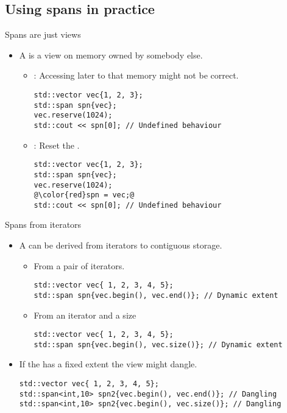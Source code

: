 \subsection{Using spans in practice}

\begin{frame}[t,fragile]{Spans are just views}
\begin{itemize}
  \item A  is a view on memory owned by somebody else.
    \begin{itemize}
      \item {}: Accessing later to that memory might not be correct.
\begin{lstlisting}
std::vector vec{1, 2, 3};
std::span spn{vec};
vec.reserve(1024);
std::cout << spn[0]; // Undefined behaviour
\end{lstlisting}

      \item {}: Reset the .
\begin{lstlisting}[escapechar=@]
std::vector vec{1, 2, 3};
std::span spn{vec};
vec.reserve(1024);
@\color{red}spn = vec;@
std::cout << spn[0]; // Undefined behaviour
\end{lstlisting}
    \end{itemize}
\end{itemize}
\end{frame}

\begin{frame}[t,fragile]{Spans from iterators}
\begin{itemize}
  \item A  can be derived from iterators 
        to contiguous storage.
    \begin{itemize}
      \item From a pair of iterators.
\begin{lstlisting}
std::vector vec{ 1, 2, 3, 4, 5};
std::span spn{vec.begin(), vec.end()}; // Dynamic extent
\end{lstlisting}

      \item From an iterator and a size
\begin{lstlisting}
std::vector vec{ 1, 2, 3, 4, 5};
std::span spn{vec.begin(), vec.size()}; // Dynamic extent
\end{lstlisting}
    \end{itemize}

  \item If the  has a fixed extent
        the view might dangle.
\begin{lstlisting}
std::vector vec{ 1, 2, 3, 4, 5};
std::span<int,10> spn2{vec.begin(), vec.end()}; // Dangling
std::span<int,10> spn2{vec.begin(), vec.size()}; // Dangling
\end{lstlisting}
\end{itemize}
\end{frame}

